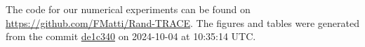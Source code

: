 The code for our numerical experiments can be found on \url{https://github.com/FMatti/Rand-TRACE}. The figures and tables were generated from the commit \href{https://github.com/FMatti/Rand-TRACE/tree/de1c340}{de1c340} on 2024-10-04 at 10:35:14 UTC.
